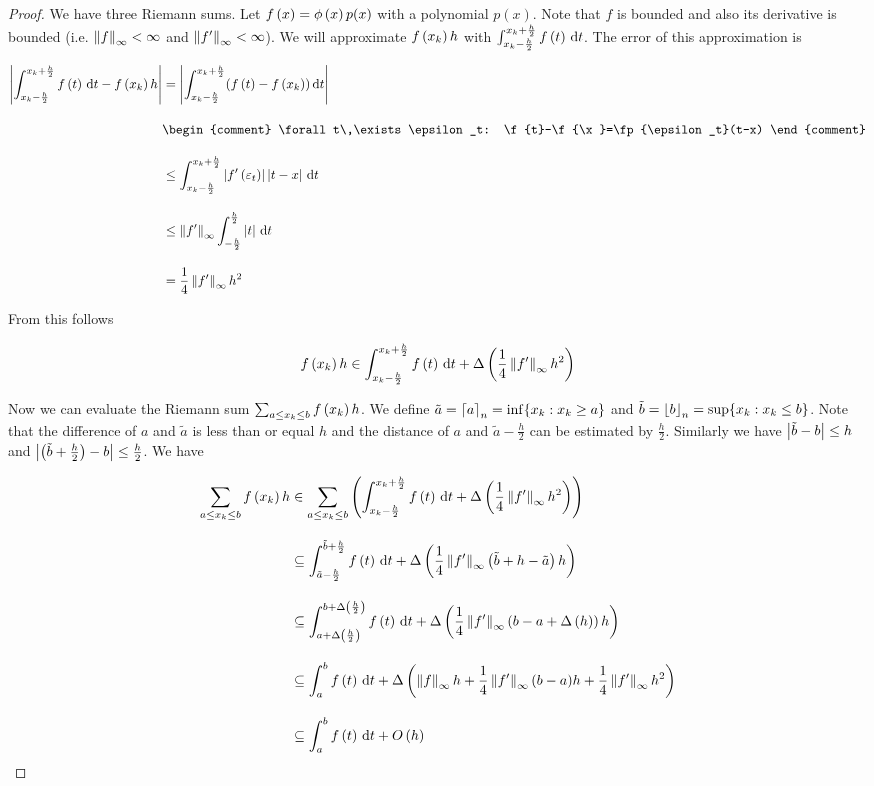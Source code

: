 \begin{proof}
  We have three Riemann sums. Let $f\left({x}\right)=\phi\left( {x} \right)p(x)$ with a polynomial $p(x)$. Note that $f$ is bounded and also its derivative is bounded (i.e. $\left\|{f}\right\|_\infty < \infty$ and $\left\|{f'}\right\|_\infty<\infty$). We will approximate $f\left({x_{k}}\right)h$ with $\int_{x_{k}-\frac h2}^{x_{k}+\frac h2} f\left({t}\right) \,\mathrm d{t}$. The error of this approximation is

  \begin{align}
    \abs{\int_{\x-\frac h2}^{\x+\frac h2} \f{t} \d{t} - \f{\x} h} &= \abs{\int_{\x-\frac h2}^{\x+\frac h2} (\f{t}-\f{\x}) \d{t}} \bnl
    &
    \begin{comment}
      \forall t\,\exists \epsilon_t: \f{t}-\f{\x}=\fp{\epsilon_t}(t-x)
    \end{comment} \bnl
    & \le \int_{\x-\frac h2}^{\x+\frac h2} \abs{\fp{\epsilon_t}} \abs{t-x} \d{t} \bnl
    & \le \snorm{f'} \int_{-\frac h2}^{\frac h2} \abs{t} \d{t} \bnl
    & = \frac 14 \snorm{f'} h^2
  \end{align}

  \noindent From this follows

  \begin{align}
    f\left({x_{k}}\right) h \in \int_{x_{k}-\frac h2}^{x_{k}+\frac h2} f\left({t}\right) \,\mathrm d{t} + \Delta\left( {\frac 14 \left\|{f'}\right\|_\infty h^2} \right)
  \end{align}

  Now we can evaluate the Riemann sum $\sum_{a \le x_{k} \le b} f\left({x_{k}}\right) h$. We define $\tilde a = \left\lceil {a} \right\rceil_n = \inf \{ x_{k} : x_{k} \ge a \}$ and $\tilde b = \left\lfloor {b} \right\rfloor_n = \sup \{ x_{k} : x_{k} \le b \}$. Note that the difference of $a$ and $\tilde a$ is less than or equal $h$ and the distance of $a$ and $\tilde a - \frac h2$ can be estimated by $\frac h2$. Similarly we have $\left|{\tilde b-b}\right| \le h$ and $\left|{\left( {\tilde b+\frac h2} \right)-b}\right| \le \frac h2$.  We have 

  \begin{align}
    \sum_{a \le \x \le b} \f{\x} h & \in \sum_{a\le \x\le b} \br{\int_{\x-\frac h2}^{\x+\frac h2} \f{t} \d{t} + \bigabs{\frac 14 \snorm{f'} h^2}} \bnl
    & \subseteq \int_{\tilde a - \frac h2}^{\tilde b + \frac h2} \f{t} \d{t} + \bigabs{\frac 14 \snorm{f'}\br{\tilde b + h - \tilde a} h}\bnl
    & \subseteq \int_{a+\bigabs{\frac h2}}^{b+\bigabs{\frac h2}} \f{t} \d{t} + \bigabs{\frac 14\snorm{f'}\br{b-a+\bigabs{h}} h}\bnl
    & \subseteq \int_a^b \f{t} \d{t} + \bigabs{\snorm{f}h + \frac 14 \snorm{f'} (b-a) h + \frac 14 \snorm{f'} h^2} \bnl
    & \subseteq  \int_a^b \f{t} \d{t} + \bigo{h}
  \end{align}


\end{proof}
